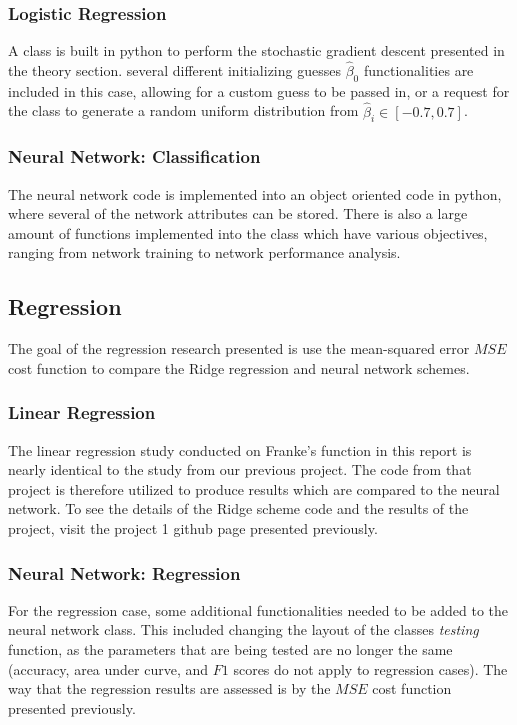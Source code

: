         \subsubsection{Logistic Regression}
            A class is built in python to perform the stochastic gradient descent presented in the theory section. several different initializing guesses $\hat{\beta}_0$ functionalities are included in this case, allowing for a custom guess to be passed in, or a request for the class to generate a random uniform distribution from $\hat{\beta}_i \in [-0.7, 0.7]$.
                
        \subsubsection{Neural Network: Classification}
            The neural network code is implemented into an object oriented code in python, where several of the network attributes can be stored. There is also a large amount of functions implemented into the class which have various objectives, ranging from network training to network performance analysis. 
        
            
    \subsection{Regression}
        The goal of the regression research presented is use the mean-squared error $MSE$ cost function to compare the Ridge regression and neural network schemes. 
        \subsubsection{Linear Regression}
            The linear regression study conducted on Franke's function in this report is nearly identical to the study from our previous project. The code from that project is therefore utilized to produce results which are compared to the neural network. To see the details of the Ridge scheme code and the results of the project, visit the project 1 github page presented previously.
        \subsubsection{Neural Network: Regression}
            For the regression case, some additional functionalities needed to be added to the neural network class. This included changing the layout of the classes \textit{testing} function, as the parameters that are being tested are no longer the same (accuracy, area under curve, and $F1$ scores do not apply to regression cases). The way that the regression results are assessed is by the $MSE$ cost function presented previously. 